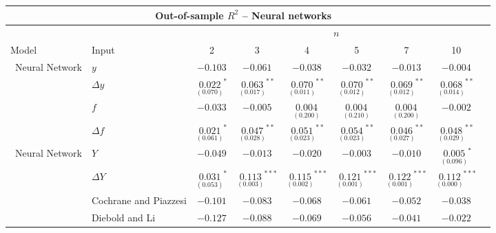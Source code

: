 \begin{tabular}{llccccccc}
\hline
	\multicolumn{8}{c}{Out-of-sample $R^2$ -- Neural networks}\\\hline
	&& \multicolumn{6}{c}{$n$}\\\cline{3-8}
Model & Input  & 2  & 3      & 4       & 5       & 7 & 10 \\
\hline
\ Neural Network & $y$ & $-0.103$ & $-0.061$ & $-0.038$ & $-0.032$ & $-0.013$ & $-0.004$ \\
 & $\Delta y$ & $\underset{(0.070)}{0.022}^{*}$ & $\underset{(0.017)}{0.063}^{**}$ & $\underset{(0.011)}{0.070}^{**}$ & $\underset{(0.012)}{0.070}^{**}$ & $\underset{(0.012)}{0.069}^{**}$ & $\underset{(0.014)}{0.068}^{**}$ \\
 & $f$ & $-0.033$ & $-0.005$ & $\underset{(0.200)}{0.004}^{}$ & $\underset{(0.210)}{0.004}^{}$ & $\underset{(0.200)}{0.004}^{}$ & $-0.002$ \\
 & $\Delta f$ & $\underset{(0.061)}{0.021}^{*}$ & $\underset{(0.028)}{0.047}^{**}$ & $\underset{(0.023)}{0.051}^{**}$ & $\underset{(0.023)}{0.054}^{**}$ & $\underset{(0.027)}{0.046}^{**}$ & $\underset{(0.029)}{0.048}^{**}$ \\
\hline
\ Neural Network & $Y$ & $-0.049$ & $-0.013$ & $-0.020$ & $-0.003$ & $-0.010$ & $\underset{(0.096)}{0.005}^{*}$ \\
 & $\Delta Y$ & $\underset{(0.053)}{0.031}^{*}$ & $\underset{(0.003)}{0.113}^{***}$ & $\underset{(0.002)}{0.115}^{***}$ & $\underset{(0.001)}{0.121}^{***}$ & $\underset{(0.001)}{0.122}^{***}$ & $\underset{(0.000)}{0.112}^{***}$ \\
 & Cochrane and Piazzesi & $-0.101$ & $-0.083$ & $-0.068$ & $-0.061$ & $-0.052$ & $-0.038$ \\
 & Diebold and Li & $-0.127$ & $-0.088$ & $-0.069$ & $-0.056$ & $-0.041$ & $-0.022$ \\
\hline
    \end{tabular}
